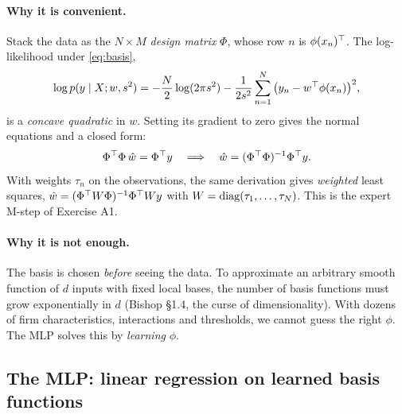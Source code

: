 \paragraph{Why it is convenient.} Stack the data as the $N\times M$ \emph{design matrix} $\Phi$, whose row $n$ is $\phi(x_n)^{\top}$. The log-likelihood under \eqref{eq:basis},
\begin{equation}
\log p(y\mid X;w,s^2)= -\frac N2\log(2\pi s^2) - \frac{1}{2s^2}\sum_{n=1}^N\big(y_n-w^{\top}\phi(x_n)\big)^2,
\end{equation}
is a \emph{concave quadratic} in $w$. Setting its gradient to zero gives the normal equations and a closed form:
\begin{equation}
\Phi^{\top}\Phi\,\hat w = \Phi^{\top} y\quad\Longrightarrow\quad \hat w=(\Phi^{\top}\Phi)^{-1}\Phi^{\top} y.
\end{equation}
With weights $\tau_n$ on the observations, the same derivation gives \emph{weighted} least squares, $\hat w=(\Phi^{\top} W\Phi)^{-1}\Phi^{\top} W y$ with $W=\operatorname{diag}(\tau_1,\dots,\tau_N)$. This is the expert M-step of Exercise A1.

\paragraph{Why it is not enough.} The basis is chosen \emph{before} seeing the data. To approximate an arbitrary smooth function of $d$ inputs with fixed local bases, the number of basis functions must grow exponentially in $d$ (Bishop \S1.4, the curse of dimensionality). With dozens of firm characteristics, interactions and thresholds, we cannot guess the right $\phi$. The MLP solves this by \emph{learning} $\phi$.

\subsection{The MLP: linear regression on learned basis functions}

